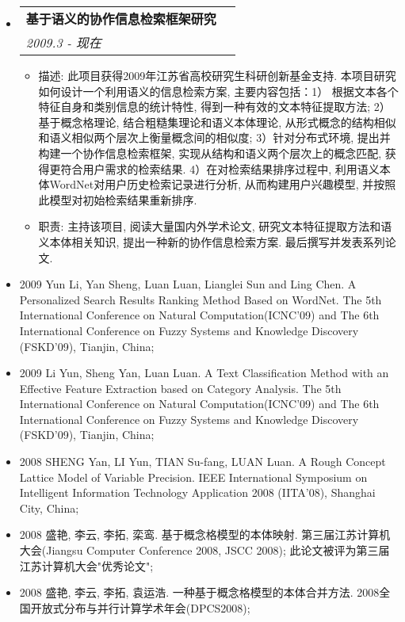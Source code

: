 \documentclass[letterpaper,11pt]{article}
\makeatletter
\newcommand{\resitem}[1]{\item #1 \vspace{-2pt}}
\newcommand{\resheading}[1]{{\large \parashade[.9]{sharpcorners}{\textbf{#1 \vphantom{p\^{E}}}}}}
\newcommand{\ressubheading}[4]{
\begin{tabular*}{6.5in}{l@{\extracolsep{\fill}}r}
        \textbf{#1} & #2 \\
        \textit{#3} & \textit{#4} \\
\end{tabular*}\vspace{-2pt}}
\makeatother
\begin{document}
\begin{itemize}
\item
    \ressubheading{基于语义的协作信息检索框架研究}{}{2009.3 - 现在}{}
    \begin{itemize}
        \resitem{   描述: 此项目获得2009年江苏省高校研究生科研创新基金支持. 本项目研究如何设计一个利用语义的信息检索方案, 主要内容包括：1） 根据文本各个特征自身和类别信息的统计特性, 得到一种有效的文本特征提取方法; 2）基于概念格理论, 结合粗糙集理论和语义本体理论, 从形式概念的结构相似和语义相似两个层次上衡量概念间的相似度; 3）针对分布式环境, 提出并构建一个协作信息检索框架, 实现从结构和语义两个层次上的概念匹配, 获得更符合用户需求的检索结果. 4）在对检索结果排序过程中, 利用语义本体WordNet对用户历史检索记录进行分析, 从而构建用户兴趣模型, 并按照此模型对初始检索结果重新排序.}
        \resitem{   职责: 主持该项目, 阅读大量国内外学术论文, 研究文本特征提取方法和语义本体相关知识, 提出一种新的协作信息检索方案. 最后撰写并发表系列论文.}
    \end{itemize}
\end{itemize}

\resheading{发表论文}
\begin{itemize}
\item{2009 }
Yun Li, Yan Sheng, Luan Luan, Lianglei Sun and Ling Chen. A
Personalized Search Results Ranking Method Based on WordNet. The 5th
International Conference on Natural Computation(ICNC'09) and The 6th
International Conference on Fuzzy Systems and  Knowledge Discovery
(FSKD'09), Tianjin, China;

\item{2009 }
Li Yun, Sheng Yan, Luan Luan. A Text Classification Method with an
Effective Feature Extraction based on Category Analysis. The 5th
International Conference on Natural Computation(ICNC'09) and The 6th
International Conference on Fuzzy Systems and Knowledge Discovery
(FSKD'09), Tianjin, China;

\item{2008 }
SHENG Yan, LI Yun, TIAN Su-fang, LUAN Luan. A Rough Concept Lattice
Model of Variable Precision. IEEE International Symposium on
Intelligent Information Technology Application 2008 (IITA'08),
Shanghai City, China;
\item{2008 }
盛艳, 李云, 李拓, 栾鸾. 基于概念格模型的本体映射.
第三届江苏计算机大会(Jiangsu Computer Conference 2008, JSCC 2008);
此论文被评为第三届江苏计算机大会"优秀论文";

\item{2008 }
盛艳, 李云, 李拓, 袁运浩. 一种基于概念格模型的本体合并方法.
2008全国开放式分布与并行计算学术年会(DPCS2008);

\end{itemize}
\end{document}
